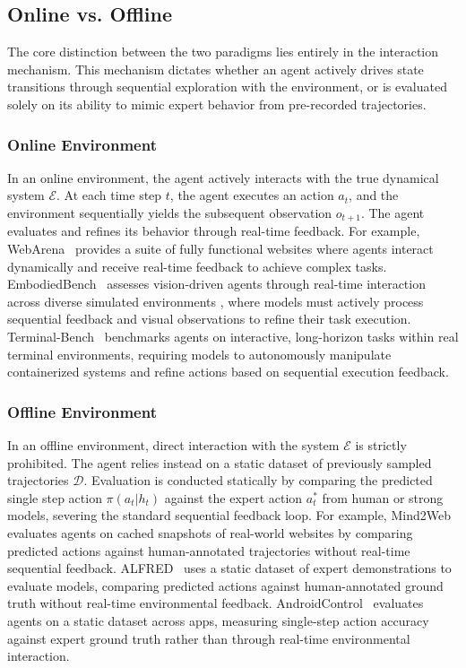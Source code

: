 \subsection{Online vs. Offline}
\label{attribute:Online vs. Offline}
The core distinction between the two paradigms lies entirely in the interaction mechanism. This mechanism dictates whether an agent actively drives state transitions through sequential exploration with the environment, or is evaluated solely on its ability to mimic expert behavior from pre-recorded trajectories.

\subsubsection{Online Environment}
In an online environment, the agent actively interacts with the true dynamical system $\mathcal{E}$. At each time step $t$, the agent executes an action $a_t$, and the environment sequentially yields the subsequent observation $o_{t+1}$. The agent evaluates and refines its behavior through real-time feedback. For example, WebArena~\cite{WebArena} provides a suite of fully functional websites where agents interact dynamically and receive real-time feedback to achieve complex tasks. EmbodiedBench~\cite{EmbodiedBench} assesses vision-driven agents through real-time interaction across diverse simulated environments , where models must actively process sequential feedback and visual observations to refine their task execution. Terminal-Bench~\cite{Terminal-Bench} benchmarks agents on interactive, long-horizon tasks within real terminal environments, requiring models to autonomously manipulate containerized systems and refine actions based on sequential execution feedback.

\subsubsection{Offline Environment}
In an offline environment, direct interaction with the system $\mathcal{E}$ is strictly prohibited. The agent relies instead on a static dataset of previously sampled trajectories $\mathcal{D}$. Evaluation is conducted statically by comparing the predicted single step action $\pi(a_t | h_t)$ against the expert action $a^*_t$ from human or strong models, severing the standard sequential feedback loop. For example, Mind2Web~\cite{Mind2Web} evaluates agents on cached snapshots of real-world websites by comparing predicted actions against human-annotated trajectories without real-time sequential feedback. ALFRED~\cite{ALFRED} uses a static dataset of expert demonstrations to evaluate models, comparing predicted actions against human-annotated ground truth without real-time environmental feedback. AndroidControl~\cite{AndroidControl} evaluates agents on a static dataset across apps, measuring single-step action accuracy against expert ground truth rather than through real-time environmental interaction.

